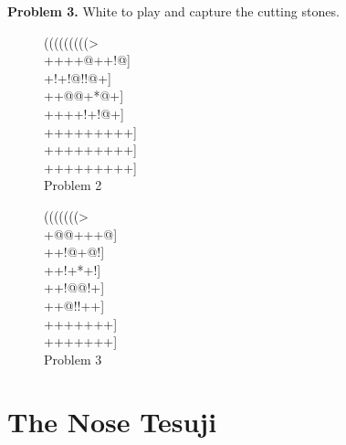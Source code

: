 \documentclass[mcrownvopaper,10pt,oneside,onecolumn,draft,showtrims]{memoir}
\begin{document}
\noindent
\textbf{Problem 3.} White to play and capture the cutting stones.

\begin{figure}[ht]
    \begin{minipage}[c]{0.50\linewidth}
        \centering    
        {\gnos%
        (((((((((>\\
        ++++@++!@]\\
        +!+!@!!@+]\\
        ++@@+*@+]\\
        ++++!+!@+]\\
        +++++++++]\\
        +++++++++]\\
        +++++++++]\\
        }
        Problem 2
    \end{minipage}%
    \begin{minipage}[c]{0.50\linewidth}
        \centering    
        {\gnos%
        (((((((>\\
        +@@+++@]\\
        ++!@+@!]\\
        ++!+*+!]\\
        ++!@@!+]\\
        ++@!!++]\\
        +++++++]\\
        +++++++]\\
        }
        Problem 3
    \end{minipage}%
\end{figure}  

\section{The Nose Tesuji}
\end{document}
